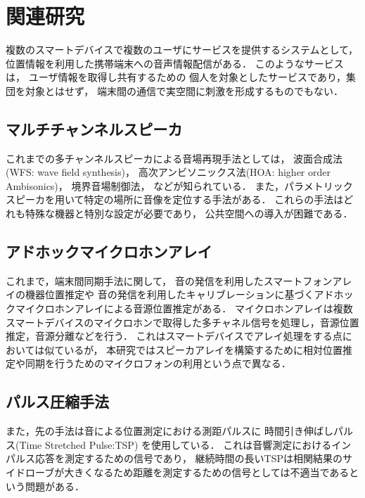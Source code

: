 \chapter{関連研究}

複数のスマートデバイスで複数のユーザにサービスを提供するシステムとして，
位置情報を利用した携帯端末への音声情報配信\cite{kawagoe14}がある．
このようなサービスは，
ユーザ情報を取得し共有するための
個人を対象としたサービスであり，集団を対象とはせず，
端末間の通信で実空間に刺激を形成するものでもない．


\section{マルチチャンネルスピーカ}

これまでの多チャンネルスピーカによる音場再現手法としては，
波面合成法(WFS: wave field synthesis)\cite{wfs}，
高次アンビソニックス法(HOA: higher order Ambisonics)\cite{hoa}，
境界音場制御法\cite{sfc}，
などが知られている．
また，パラメトリックスピーカを用いて特定の場所に音像を定位する手法\cite{paramsp}がある．
これらの手法はどれも特殊な機器と特別な設定が必要であり，
公共空間への導入が困難である．


\section{アドホックマイクロホンアレイ}

これまで，端末間同期手法に関して，
音の発信を利用したスマートフォンアレイの機器位置推定\cite{shibata13}や
音の発信を利用したキャリブレーションに基づくアドホックマイクロホンアレイによる音源位置推定\cite{shibata14}がある．
マイクロホンアレイは複数スマートデバイスのマイクロホンで取得した多チャネル信号を処理し，音源位置推定，音源分離などを行う．
これはスマートデバイスでアレイ処理をする点においては似ているが，
本研究ではスピーカアレイを構築するために相対位置推定や同期を行うためのマイクロフォンの利用という点で異なる．


\section{パルス圧縮手法}

また，先の手法は音による位置測定における測距パルスに
時間引き伸ばしパルス(Time Stretched Pulse:TSP) を使用している．
これは音響測定におけるインパルス応答を測定するための信号であり\cite{Aoshima}，
継続時間の長いTSPは相関結果のサイドローブが大きくなるため距離を測定するための信号としては不適当であるという問題がある．



